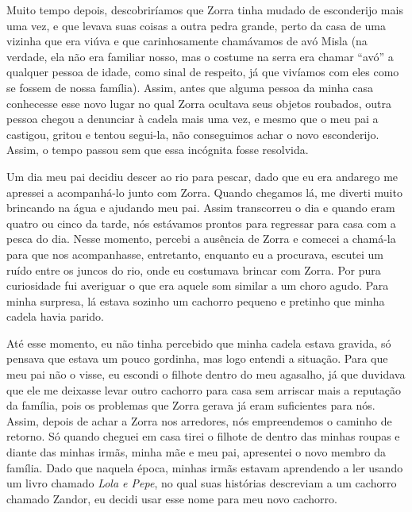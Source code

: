 Muito tempo depois, descobriríamos que Zorra tinha mudado de esconderijo mais uma vez, e que levava suas coisas a outra pedra grande, perto da casa de uma vizinha que era viúva e que carinhosamente chamávamos de avó Misla (na verdade, ela não era familiar nosso, mas o costume na serra era chamar ``avó'' a qualquer pessoa de idade, como sinal de respeito, já que vivíamos com eles como se fossem de nossa família).
Assim, antes que alguma pessoa da minha casa conhecesse esse novo lugar no qual Zorra ocultava seus objetos roubados, outra pessoa chegou a denunciar à cadela mais uma vez, e mesmo que o meu pai a castigou, gritou e tentou segui-la, não conseguimos achar o novo esconderijo. Assim, o tempo passou sem que essa incógnita fosse resolvida. 

Um dia meu pai decidiu descer ao rio para pescar, dado que eu era andarego me apressei a acompanhá-lo junto com Zorra. 
Quando chegamos lá, me diverti muito brincando na água e ajudando meu pai. Assim transcorreu o dia e quando eram quatro ou cinco da tarde, nós estávamos prontos para regressar para casa com a pesca do dia.
Nesse momento, percebi a ausência de Zorra e comecei a chamá-la para que nos acompanhasse, 
entretanto, enquanto eu a procurava, escutei um ruído entre os juncos do rio, onde eu costumava brincar com Zorra. 
Por pura curiosidade fui averiguar o que era aquele som similar a um choro agudo. Para minha surpresa, lá estava sozinho um cachorro pequeno e pretinho que minha cadela havia parido. 
 
Até esse momento, eu não tinha percebido que minha cadela estava gravida, só pensava que estava um pouco gordinha,
mas logo entendi a situação.
Para que meu pai não o visse, eu escondi o filhote dentro do meu agasalho, já que duvidava que ele me deixasse levar outro cachorro para casa sem arriscar mais a reputação da família, pois os problemas que Zorra gerava já eram suficientes para nós.
Assim, depois de achar a Zorra nos arredores, nós empreendemos o caminho de retorno.
Só quando cheguei em casa tirei o filhote de dentro das minhas roupas e diante das minhas irmãs, minha mãe e meu pai, apresentei o novo membro da família. Dado que naquela época, minhas irmãs estavam aprendendo a ler usando um livro chamado \textit{Lola e Pepe}, no qual suas histórias descreviam a um cachorro chamado Zandor, eu decidi usar esse nome para meu novo cachorro. 

